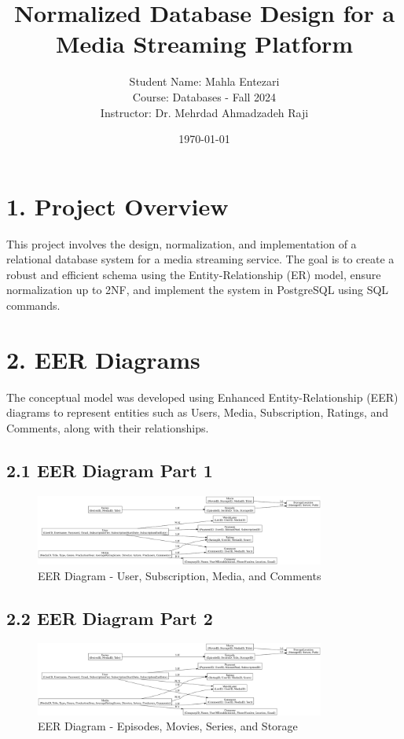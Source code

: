 \documentclass[12pt]{article}
\title{\textbf{Normalized Database Design for a Media Streaming Platform}}
\author{Student Name: Mahla Entezari \\
Course: Databases - Fall 2024 \\
Instructor: Dr. Mehrdad Ahmadzadeh Raji}
\date{\today}
\begin{document}
\maketitle

\section*{1. Project Overview}
This project involves the design, normalization, and implementation of a relational database system for a media streaming service. The goal is to create a robust and efficient schema using the Entity-Relationship (ER) model, ensure normalization up to 2NF, and implement the system in PostgreSQL using SQL commands.

\section*{2. EER Diagrams}
The conceptual model was developed using Enhanced Entity-Relationship (EER) diagrams to represent entities such as Users, Media, Subscription, Ratings, and Comments, along with their relationships.

\subsection*{2.1 EER Diagram Part 1}
\begin{figure}[h!]
    \centering
    \includegraphics[width=0.85\textwidth]{eer1_converted.jpg}
    \caption{EER Diagram - User, Subscription, Media, and Comments}
\end{figure}

\subsection*{2.2 EER Diagram Part 2}
\begin{figure}[h!]
    \centering
    \includegraphics[width=0.85\textwidth]{eer2_converted.jpg}
    \caption{EER Diagram - Episodes, Movies, Series, and Storage}
\end{figure}
\end{document}
